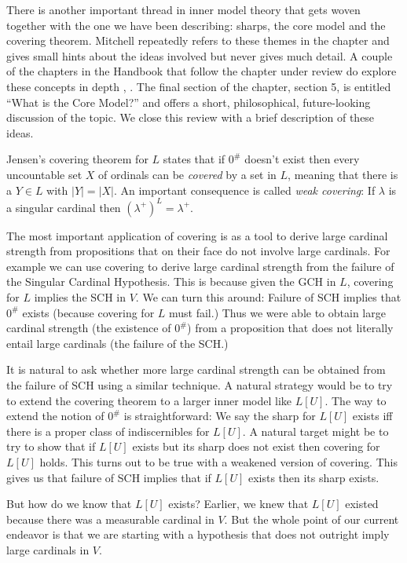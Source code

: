 \documentclass[oneside,12pt]{amsart}
\begin{document}
There is another important thread in inner model theory that gets woven together with
the one we have been describing: sharps, the core model and the covering theorem.
Mitchell repeatedly refers to these themes in the chapter and gives small hints about
the ideas involved but never gives much detail. A couple of the chapters in the
Handbook that follow the chapter under review do explore these concepts in depth
\cite{CoveringLemmaInHandbook}, \cite{CoreModelToolbox}.
The final section of the chapter, section 5, is entitled ``What is the Core Model?''
and offers a short, philosophical, future-looking discussion of the topic.
We close this review with a brief description of these ideas.

Jensen's covering theorem for $L$ states that if $0^{\#}$ doesn't exist then every
uncountable set $X$ of ordinals can be \emph{covered} by a set in $L$, meaning
that there is a $Y\in L$ with $|Y| = |X|$. An important consequence is called
\emph{weak covering}: If $\lambda$ is a singular cardinal then $(\lambda^{+})^L=\lambda^{+}$.

The most important application of covering is as a tool to derive large cardinal
strength from propositions that on their face do not involve large cardinals.
For example we can use covering to derive large cardinal strength from the failure of the
Singular Cardinal Hypothesis. This is because given the GCH in $L$, covering
for $L$ implies the SCH in $V$. We can turn this around: Failure of SCH implies
that $0^{\#}$ exists (because covering for $L$ must fail.) Thus we were able to
obtain large cardinal strength (the existence of $0^{\#}$) from a proposition that
does not literally entail large cardinals (the failure of the SCH.)

It is natural to ask whether more large cardinal strength can be obtained from
the failure of SCH using a similar technique. A natural strategy would be
to try to extend the covering theorem to a larger inner model like $L[U]$.
The way to extend the notion of $0^{\#}$ is straightforward: We say the sharp for
$L[U]$ exists iff there is a proper class of indiscernibles for $L[U]$. A natural
target might be to try to show that if $L[U]$ exists but
its sharp does not exist then covering for $L[U]$ holds. This turns out to be
true with a weakened version of covering. This gives us that failure of SCH
implies that if $L[U]$ exists then its sharp exists.

But how do we know that $L[U]$ exists? Earlier, we knew that $L[U]$ existed
because there was a measurable cardinal
in $V$. But the whole point of our current endeavor is that we are starting
with a hypothesis that does not outright imply large cardinals in $V$.
\end{document}
